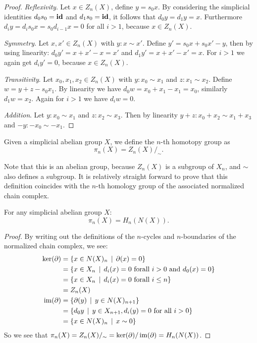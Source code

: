 \begin{proof}
	\emph{Reflexivity}. Let $x \in Z_n(X)$, define $y = s_0 x$. By considering the simplicial identities $d_0 s_0 = \mathbf{id}$ and $d_1 s_0 = \mathbf{id}$, it follows that $d_0 y = d_1 y = x$. Furthermore $d_i y = d_i s_0 x = s_0 d_{i-1} x = 0$ for all $i > 1$, because $x \in Z_n(X)$.

	\emph{Symmetry}. Let $x, x' \in Z_n(X)$ with $y: x \sim x'$. Define $y' = s_0 x + s_0 x' - y$, then by using linearity: $d_0 y' = x + x' - x = x'$ and $d_1 y' = x + x' - x' = x$. For $i>1$ we again get $d_i y' = 0$, because $x \in Z_n(X)$.

	\emph{Transitivity}. Let $x_0, x_1, x_2 \in Z_n(X)$ with $y: x_0 \sim x_1$ and $z: x_1 \sim x_2$. Define $w = y + z - s_0 x_1$. By linearity we have $d_0 w = x_0 + x_1 -x_1 = x_0$, similarly $d_1 w = x_2$. Again for $i>1$ we have $d_i w = 0$.

	\emph{Addition}. Let $y: x_0 \sim x_1$ and $z: x_2 \sim x_3$. Then by linearity $y + z: x_0 + x_2 \sim x_1 + x_3$ and $-y: -x_0 \sim -x_1$.
\end{proof}

\begin{definition}
	Given a simplicial abelian group $X$, we define the $n$-th homotopy group as
	$$ \pi_n(X) = Z_n(X) /_\sim. $$
\end{definition}

Note that this is an abelian group, because $Z_n(X)$ is a subgroup of $X_n$, and $\sim$ also defines a subgroup. It is relatively straight forward to prove that this definition coincides with the $n$-th homology group of the associated normalized chain complex.

\begin{lemma}
	For any simplicial abelian group $X$:
	$$ \pi_n(X) = H_n(N(X)). $$
\end{lemma}
\begin{proof}
	By writing out the definitions of the $n$-cycles and $n$-boundaries of the normalized chain complex, we see:
	\begin{align*}
		\ker(\partial) &= \{ x \in N(X)_n \,\mid\, \partial(x) = 0 \} \\
			&= \{ x \in X_n \,\mid\, d_i(x) = 0 \text{ forall } i > 0 \text{ and } d_0(x) = 0 \} \\
			&= \{ x \in X_n \,\mid\, d_i(x) = 0 \text{ forall } i \leq n \} \\
			&= Z_n(X) \\
		\operatorname{im}(\partial) &= \{ \partial(y) \,\mid\, y \in N(X)_{n+1} \} \\
			&= \{ d_0 y \,\mid\, y \in X_{n+1}, d_i(y) = 0 \text{ for all } i > 0 \} \\
			&= \{ x \in N(X)_n \,\mid\, x \sim 0 \}
	\end{align*}
	So we see that $\pi_n(X) = Z_n(X) /_\sim = \ker(\partial) / \operatorname{im}(\partial) = H_n(N(X))$.
\end{proof}

